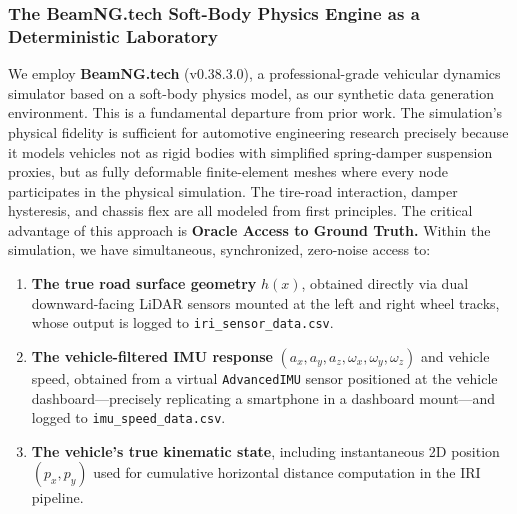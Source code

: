 \documentclass[conference]{IEEEtran}
\begin{document}
\subsubsection{The BeamNG.tech Soft-Body Physics Engine as a Deterministic Laboratory}
We employ \textbf{BeamNG.tech} (v0.38.3.0), a professional-grade vehicular dynamics simulator based on a soft-body physics model, as our synthetic data generation environment.
This is a fundamental departure from prior work. The simulation's physical fidelity is sufficient for automotive engineering research precisely because it models vehicles not as rigid bodies with simplified spring-damper suspension proxies, but as fully deformable finite-element meshes where every node participates in the physical simulation.
The tire-road interaction, damper hysteresis, and chassis flex are all modeled from first principles.
The critical advantage of this approach is \textbf{Oracle Access to Ground Truth.} Within the simulation, we have simultaneous, synchronized, zero-noise access to:
\begin{enumerate}
    \item \textbf{The true road surface geometry} $h(x)$, obtained directly via dual downward-facing LiDAR sensors mounted at the left and right wheel tracks, whose output is logged to \texttt{iri\_sensor\_data.csv}.
    \item \textbf{The vehicle-filtered IMU response} $(a_x, a_y, a_z, \omega_x, \omega_y, \omega_z)$ and vehicle speed, obtained from a virtual \texttt{AdvancedIMU} sensor positioned at the vehicle dashboard---precisely replicating a smartphone in a dashboard mount---and logged to \texttt{imu\_speed\_data.csv}.
    \item \textbf{The vehicle's true kinematic state}, including instantaneous 2D position $(p_x, p_y)$ used for cumulative horizontal distance computation in the IRI pipeline.
\end{enumerate}
\end{document}

